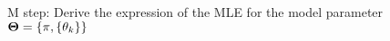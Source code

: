 M step: Derive the expression of the MLE for the model parameter $\bold{\Theta} = \{\bold{\pi}, \{\bold{\theta}_k\}\}$